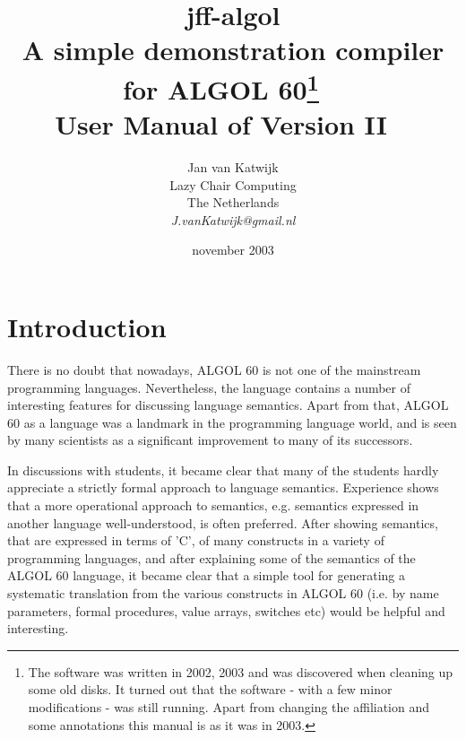 \documentclass[11pt]{article}
\begin{document}
\title{{\huge jff-algol}\\
{\normalsize A simple demonstration compiler for ALGOL 60\footnote{The software was written in 2002, 2003 and was discovered when cleaning up some old disks. It turned out that the software - with a few minor modifications - was still running. Apart from changing the affiliation
and some annotations this manual is as it was in 2003.}}
\ \\
User Manual of Version II
\ \\
}
\author{Jan van Katwijk\\
Lazy Chair Computing\\
The Netherlands\\
{\em J.vanKatwijk@gmail.nl}}
\date{november 2003}
\maketitle

\section{Introduction}
There is no doubt that nowadays, ALGOL 60 is
not one of the mainstream programming languages.
Nevertheless, the language contains a number of interesting features for
discussing language semantics. Apart from that, ALGOL 60 as a language was
a landmark in the programming language world, and is seen by 
many scientists as a significant improvement to many of its successors.

In discussions with students, it became clear that many
of the students hardly appreciate
a strictly formal approach to language semantics.
Experience shows that a more operational approach to semantics, e.g. semantics
expressed
in another language well-understood,
is often preferred. 
After showing semantics, that are expressed in terms of 'C', of many
constructs in a variety of programming languages, 
and after explaining some of the semantics of the ALGOL 60 language,
it became clear that a simple tool for generating a systematic translation
from the various constructs in ALGOL 60 (i.e. by name parameters,
formal procedures, value arrays, switches etc) would be helpful and
interesting.
\end{document}

